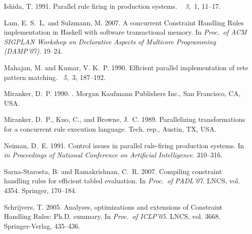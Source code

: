 \documentclass{tlp}
\begin{document}
\begin{thebibliography}{}
{\sc Ishida, T.} 1991.
\newblock Parallel rule firing in production systems.
~{\em
  3,\/}~1, 11--17.

{\sc Lam, E. S.~L.} {\sc and} {\sc Sulzmann, M.} 2007.
\newblock A concurrent {Constraint Handling Rules} implementation in {Haskell}
  with software transactional memory.
\newblock In {\em Proc.\ of ACM SIGPLAN Workshop on Declarative Aspects of
  Multicore Programming (DAMP'07)}. 19--24.

{\sc Mahajan, M.} {\sc and} {\sc Kumar, V. K.~P.} 1990.
\newblock Efficient parallel implementation of rete pattern matching.
~{\em 5,\/}~3, 187--192.

{\sc Miranker, D.~P.} 1990.
.
\newblock Morgan Kaufmann Publishers Inc., San Francisco, CA, USA.

{\sc Miranker, D.~P.}, {\sc Kuo, C.}, {\sc and} {\sc Browne, J.~C.} 1989.
\newblock Parallelizing transformations for a concurrent rule execution
  language.
\newblock Tech. rep., Austin, TX, USA.

{\sc Neiman, D.~E.} 1991.
\newblock Control issues in parallel rule-firing production systems.
\newblock In {\em in Proceedings of National Conference on Artificial
  Intelligence}. 310--316.

{\sc Sarna-Starosta, B.} {\sc and} {\sc Ramakrishnan, C.~R.} 2007.
\newblock Compiling constraint handling rules for efficient tabled evaluation.
\newblock In {\em Proc.\ of PADL'07}. LNCS, vol. 4354. Springer, 170--184.

{\sc Schrijvers, T.} 2005.
\newblock Analyses, optimizations and extensions of {Constraint Handling Rules:
  Ph.D.} summary.
\newblock In {\em Proc.\ of ICLP'05}. LNCS, vol. 3668. Springer-Verlag,
  435--436.


\end{thebibliography}
\end{document}
